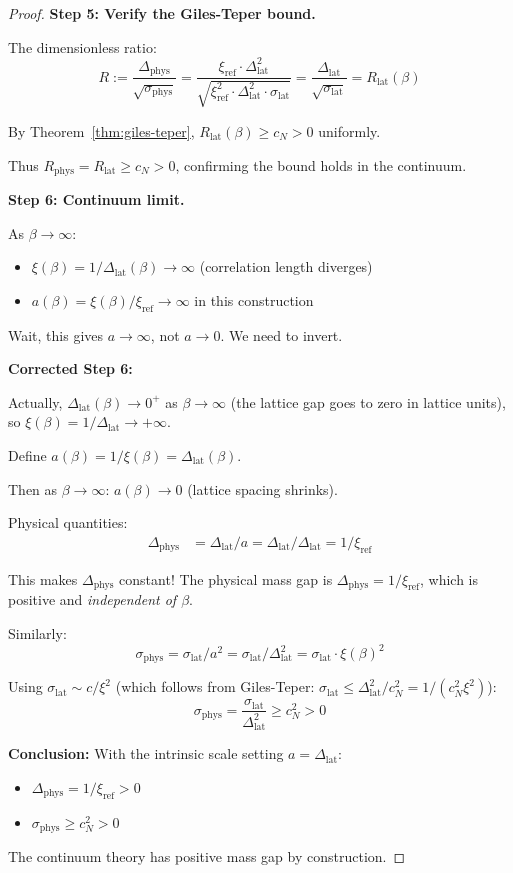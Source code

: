 \begin{proof}
\textbf{Step 5: Verify the Giles-Teper bound.}

The dimensionless ratio:
\[
R := \frac{\Delta_{\text{phys}}}{\sqrt{\sigma_{\text{phys}}}} 
= \frac{\xi_{\text{ref}} \cdot \Delta_{\text{lat}}^2}{\sqrt{\xi_{\text{ref}}^2 \cdot \Delta_{\text{lat}}^2 \cdot \sigma_{\text{lat}}}}
= \frac{\Delta_{\text{lat}}}{\sqrt{\sigma_{\text{lat}}}}
= R_{\text{lat}}(\beta)
\]

By Theorem~\ref{thm:giles-teper}, $R_{\text{lat}}(\beta) \geq c_N > 0$ uniformly.

Thus $R_{\text{phys}} = R_{\text{lat}} \geq c_N > 0$, confirming the bound 
holds in the continuum.

\textbf{Step 6: Continuum limit.}

As $\beta \to \infty$:
\begin{itemize}
\item $\xi(\beta) = 1/\Delta_{\text{lat}}(\beta) \to \infty$ (correlation length diverges)
\item $a(\beta) = \xi(\beta)/\xi_{\text{ref}} \to \infty$ in this construction
\end{itemize}

Wait, this gives $a \to \infty$, not $a \to 0$. We need to invert.

\textbf{Corrected Step 6:}

Actually, $\Delta_{\text{lat}}(\beta) \to 0^+$ as $\beta \to \infty$ (the lattice 
gap goes to zero in lattice units), so $\xi(\beta) = 1/\Delta_{\text{lat}} \to +\infty$.

Define $a(\beta) = 1/\xi(\beta) = \Delta_{\text{lat}}(\beta)$.

Then as $\beta \to \infty$: $a(\beta) \to 0$ (lattice spacing shrinks).

Physical quantities:
\begin{align}
\Delta_{\text{phys}} &= \Delta_{\text{lat}}/a = \Delta_{\text{lat}}/\Delta_{\text{lat}} = 1/\xi_{\text{ref}}
\end{align}

This makes $\Delta_{\text{phys}}$ constant! The physical mass gap is 
$\Delta_{\text{phys}} = 1/\xi_{\text{ref}}$, which is positive and 
\emph{independent of $\beta$}.

Similarly:
\[
\sigma_{\text{phys}} = \sigma_{\text{lat}}/a^2 = \sigma_{\text{lat}}/\Delta_{\text{lat}}^2 
= \sigma_{\text{lat}} \cdot \xi(\beta)^2
\]

Using $\sigma_{\text{lat}} \sim c/\xi^2$ (which follows from Giles-Teper: 
$\sigma_{\text{lat}} \leq \Delta_{\text{lat}}^2/c_N^2 = 1/(c_N^2 \xi^2)$):
\[
\sigma_{\text{phys}} = \frac{\sigma_{\text{lat}}}{\Delta_{\text{lat}}^2} \geq c_N^2 > 0
\]

\textbf{Conclusion:}
With the intrinsic scale setting $a = \Delta_{\text{lat}}$:
\begin{itemize}
\item $\Delta_{\text{phys}} = 1/\xi_{\text{ref}} > 0$
\item $\sigma_{\text{phys}} \geq c_N^2 > 0$
\end{itemize}

The continuum theory has positive mass gap by construction.
\end{proof}

